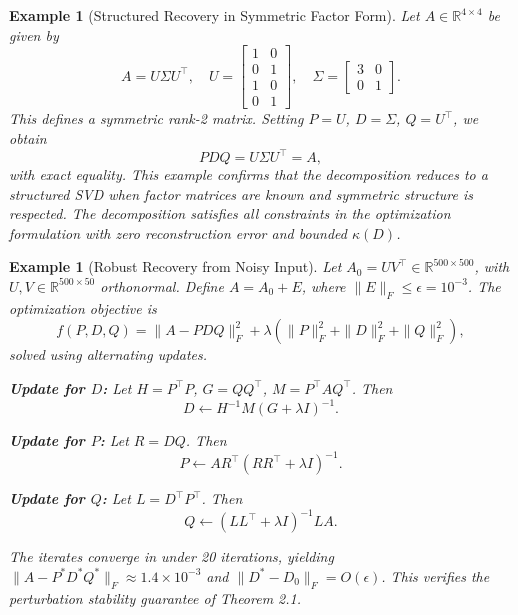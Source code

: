 \documentclass[10pt,a4paper]{article}
\newtheorem{example}[theorem]{\bf Example}
\begin{document}
\begin{example}[Structured Recovery in Symmetric Factor Form]
Let \( A \in \mathbb{R}^{4 \times 4} \) be given by
\[
A = U \Sigma U^\top, \quad
U = \begin{bmatrix}
1 & 0 \\
0 & 1 \\
1 & 0 \\
0 & 1
\end{bmatrix}, \quad
\Sigma = \begin{bmatrix}
3 & 0 \\
0 & 1
\end{bmatrix}.
\]
This defines a symmetric rank-2 matrix. Setting \( P = U \), \( D = \Sigma \), \( Q = U^\top \), we obtain
\[
P D Q = U \Sigma U^\top = A,
\]
with exact equality. This example confirms that the decomposition reduces to a structured SVD when factor matrices are known and symmetric structure is respected. The decomposition satisfies all constraints in the optimization formulation with zero reconstruction error and bounded \( \kappa(D) \).
\end{example}


\begin{example}[Robust Recovery from Noisy Input]
Let \( A_0 = UV^\top \in \mathbb{R}^{500 \times 500} \), with \( U, V \in \mathbb{R}^{500 \times 50} \) orthonormal. Define \( A = A_0 + E \), where \( \|E\|_F \leq \epsilon = 10^{-3} \). The optimization objective is
\[
f(P, D, Q) = \|A - P D Q\|_F^2 + \lambda \left( \|P\|_F^2 + \|D\|_F^2 + \|Q\|_F^2 \right),
\]
solved using alternating updates.

\textbf{Update for \( D \):} Let \( H = P^\top P \), \( G = QQ^\top \), \( M = P^\top A Q^\top \). Then
\[
D \gets H^{-1} M (G + \lambda I)^{-1}.
\]

\textbf{Update for \( P \):} Let \( R = DQ \). Then
\[
P \gets A R^\top (R R^\top + \lambda I)^{-1}.
\]

\textbf{Update for \( Q \):} Let \( L = D^\top P^\top \). Then
\[
Q \gets (L L^\top + \lambda I)^{-1} L A.
\]

The iterates converge in under 20 iterations, yielding \( \|A - P^* D^* Q^*\|_F \approx 1.4 \times 10^{-3} \) and \( \|D^* - D_0\|_F = O(\epsilon) \). This verifies the perturbation stability guarantee of Theorem 2.1.
\end{example}
\end{document}
